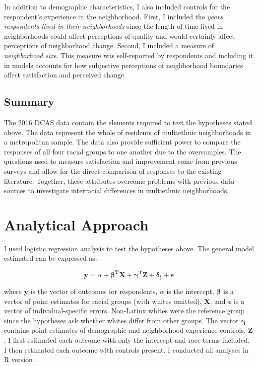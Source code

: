 \documentclass{baderart}
\begin{document}
In addition to demographic characteristics, I also included controls for the respondent's experience in the neighborhood. First, I included the \emph{years respondents lived in their neighborhoods} since the length of time lived in neighborhoods could affect perceptions of quality and would certainly affect perceptions of neighborhood change. Second, I included a measure of \emph{neighborhood size}. This measure was self-reported by respondents and including it in models accounts for how subjective perceptions of neighborhood boundaries affect satisfaction and perceived change.

\subsection{Summary}\label{summary}

The 2016 DCAS data contain the elements required to test the hypotheses stated above. The data represent the whole of residents of multiethnic neighborhoods in a metropolitan sample. The data also provide sufficient power to compare the responses of all four racial groups to one another due to the oversamples. The questions used to measure satisfaction and improvement come from previous surveys and allow for the direct comparison of responses to the existing literature. Together, these attributes overcome problems with previous data sources to investigate interracial differences in multiethnic neighborhoods.

\section{Analytical Approach}\label{analytical-approach}

I used logistic regression analysis to test the hypotheses above. The general model estimated can be expressed as:

\[\mathbf{y} = \alpha + \mathbf{\beta^T X} + \mathbf{\gamma^T Z} + \mathbf{\delta_j} + \mathbf{\epsilon}\]

\noindent where \(\mathbf{y}\) is the vector of outcomes for respondents, \(\alpha\) is the intercept, \(\mathbf{\beta}\) is a vector of point estimates for racial groups (with whites omitted), \(\mathbf{X}\), and \(\mathbf{\epsilon}\) is a vector of individual-specific errors. Non-Latinx whites were the reference group since the hypotheses ask whether whites differ from other groups. The vector \(\mathbf{\gamma}\) contains point estimates of demographic and neighborhood experience controls, \(\mathbf{Z}\). I first estimated each outcome with only the intercept and race terms included. I then estimated each outcome with controls present. I conducted all analyses in R version \Rversion.
\end{document}
